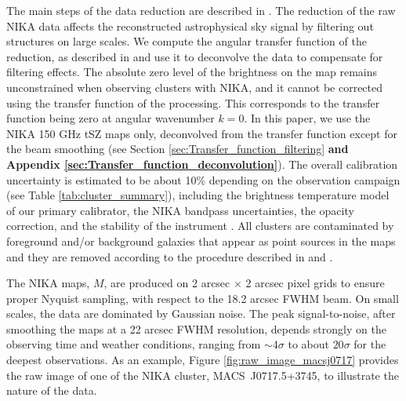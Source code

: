 \documentclass[twocolumn,traditabstract]{aa}
\begin{document}
The main steps of the data reduction are described in \cite{Adam2014,Adam2015}. The reduction of the raw NIKA data affects the reconstructed astrophysical sky signal by filtering out structures on large scales. We compute the angular transfer function of the reduction, as described in \cite{Adam2015} and use it to deconvolve the data to compensate for filtering effects. The absolute zero level of the brightness on the map remains unconstrained when observing clusters with NIKA, and it cannot be corrected using the transfer function of the processing. This corresponds to the transfer function being zero at angular wavenumber $k = 0$. In this paper, we use the NIKA 150 GHz tSZ maps only, deconvolved from the transfer function except for the beam smoothing (see Section \ref{sec:Transfer_function_filtering} {\bf and Appendix \ref{sec:Transfer_function_deconvolution}}). The overall calibration uncertainty is estimated to be about 10\% depending on the observation campaign (see Table \ref{tab:cluster_summary}), including the brightness temperature model of our primary calibrator, the NIKA bandpass uncertainties, the opacity correction, and the stability of the instrument \citep{Catalano2014}. All clusters are contaminated by foreground and/or background galaxies that appear as point sources in the maps and they are removed according to the procedure described in \cite{Adam2015} and \cite{Adam2016a}. 

The NIKA maps, $M$, are produced on 2 arcsec $\times$ 2 arcsec pixel grids to ensure proper Nyquist sampling, with respect to the 18.2 arcsec FWHM beam. On small scales, the data are dominated by Gaussian noise. The peak signal-to-noise, after smoothing the maps at a 22 arcsec FWHM resolution, depends strongly on the observing time and weather conditions, ranging from $\sim 4 \sigma$ to about $20 \sigma$ for the deepest observations. As an example, Figure \ref{fig:raw_image_macsj0717} provides the raw image of one of the NIKA cluster, \mbox{MACS~J0717.5+3745}, to illustrate the nature of the data.
\end{document}
